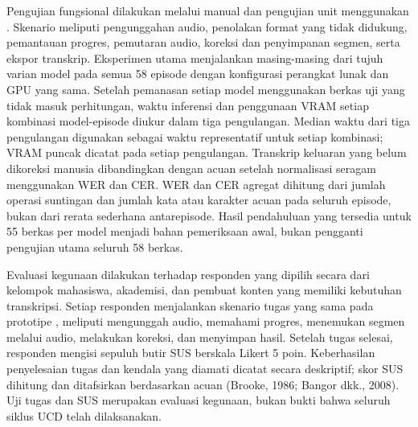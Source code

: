 Pengujian fungsional dilakukan melalui  manual dan pengujian unit menggunakan . Skenario meliputi pengunggahan audio, penolakan format yang tidak didukung, pemantauan progres, pemutaran audio, koreksi dan penyimpanan segmen, serta ekspor transkrip. Eksperimen utama menjalankan masing-masing dari tujuh varian model pada semua 58 episode dengan konfigurasi perangkat lunak dan GPU yang sama. Setelah pemanasan setiap model menggunakan berkas uji yang tidak masuk perhitungan, waktu inferensi dan penggunaan VRAM setiap kombinasi model-episode diukur dalam tiga pengulangan. Median waktu dari tiga pengulangan digunakan sebagai waktu representatif untuk setiap kombinasi; VRAM puncak dicatat pada setiap pengulangan. Transkrip keluaran yang belum dikoreksi manusia dibandingkan dengan acuan setelah normalisasi seragam menggunakan WER dan CER. WER dan CER agregat dihitung dari jumlah operasi suntingan dan jumlah kata atau karakter acuan pada seluruh episode, bukan dari rerata sederhana antarepisode. Hasil pendahuluan yang tersedia untuk 55 berkas per model menjadi bahan pemeriksaan awal, bukan pengganti pengujian utama seluruh 58 berkas.

Evaluasi kegunaan dilakukan terhadap \jumlahresponden{} responden yang dipilih secara  dari kelompok mahasiswa, akademisi, dan pembuat konten yang memiliki kebutuhan transkripsi. Setiap responden menjalankan skenario tugas yang sama pada prototipe \namasistem, meliputi mengunggah audio, memahami progres, menemukan segmen melalui audio, melakukan koreksi, dan menyimpan hasil. Setelah tugas selesai, responden mengisi sepuluh butir SUS berskala Likert 5 poin. Keberhasilan penyelesaian tugas dan kendala yang diamati dicatat secara deskriptif; skor SUS dihitung dan ditafsirkan berdasarkan acuan (Brooke, 1986; Bangor dkk., 2008). Uji tugas dan SUS merupakan evaluasi kegunaan, bukan bukti bahwa seluruh siklus UCD telah dilaksanakan.

